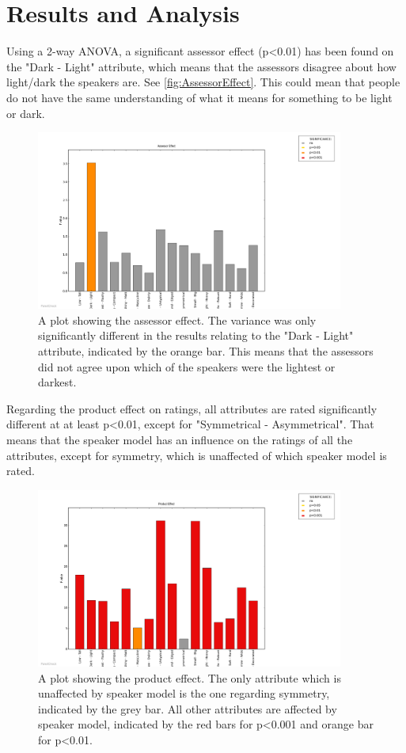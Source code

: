 \section*{Results and Analysis}
\label{Results}
%
Using a 2-way ANOVA, a significant assessor effect (p<0.01) has been found on the "Dark - Light" attribute, which means that the assessors disagree about how light/dark the speakers are. See \autoref{fig:AssessorEffect}. This could mean that people do not have the same understanding of what it means for something to be light or dark.
%
\begin{figure}[H]
\centering
\includegraphics[width =0.9\textwidth]{Figure/AssessorEffect.png} 
\caption{A plot showing the assessor effect. The variance was only significantly different in the results relating to the "Dark - Light" attribute, indicated by the orange bar. This means that the assessors did not agree upon which of the speakers were the lightest or darkest.}
\label{fig:AssessorEffect}
\end{figure}
\noindent
%
Regarding the product effect on ratings, all attributes are rated significantly different at at least p<0.01, except for "Symmetrical - Asymmetrical". That means that the speaker model has an influence on the ratings of all the attributes, except for symmetry, which is unaffected of which speaker model is rated.
%
\begin{figure}[H]
\centering
\includegraphics[width = 0.9\textwidth]{Figure/ProductEffect.png} 
\caption{A plot showing the product effect. The only attribute which is unaffected by speaker model is the one regarding symmetry, indicated by the grey bar. All other attributes are affected by speaker model, indicated by the red bars for p<0.001 and orange bar for p<0.01.}
\label{fig:ProductEffect}
\end{figure}
